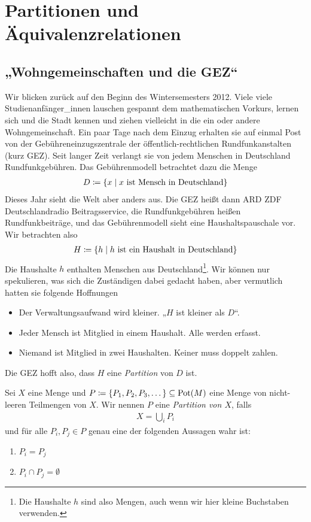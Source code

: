 \section{Partitionen und Äquivalenzrelationen}

\subsection{„Wohngemeinschaften und die GEZ“}

Wir blicken zurück auf den Beginn des Wintersemesters 2012. Viele viele
Studienanfänger\_innen lauschen gespannt dem mathematischen Vorkurs, lernen
sich und die Stadt kennen und ziehen vielleicht in die ein oder andere
Wohngemeinschaft. Ein paar Tage nach dem Einzug erhalten sie auf einmal
Post von der Gebühreneinzugszentrale der öffentlich-rechtlichen
Rundfunkanstalten (kurz GEZ). Seit langer Zeit verlangt sie von jedem
Menschen in Deutschland Rundfunkgebühren. Das Gebührenmodell betrachtet
dazu die Menge
\begin{align*}
  D \coloneqq \{ x \mid x \text{ ist Mensch in Deutschland} \}
\end{align*}
Dieses Jahr sieht die Welt aber anders aus. Die GEZ heißt dann ARD ZDF
Deutschlandradio Beitragsservice, die Rundfunkgebühren heißen
Rundfunkbeiträge, und das Gebührenmodell sieht eine Haushaltspauschale
vor. Wir betrachten also
\begin{align*}
  H \coloneqq \{ h \mid h \text{ ist ein Haushalt in Deutschland} \}
\end{align*}
Die Haushalte $h$ enthalten Menschen aus Deutschland\footnote{Die Haushalte
  $h$ sind also Mengen, auch wenn wir hier kleine Buchstaben verwenden.}.
Wir können nur spekulieren, was sich die Zuständigen dabei gedacht haben,
aber vermutlich hatten sie folgende Hoffnungen

\begin{itemize}
  \item Der Verwaltungsaufwand wird kleiner. „$H$ ist kleiner als $D$“.
  \item Jeder Mensch ist Mitglied in einem Haushalt. Alle werden erfasst.
  \item Niemand ist Mitglied in zwei Haushalten. Keiner muss doppelt zahlen.
\end{itemize}

Die GEZ hofft also, dass $H$ eine \emph{Partition} von $D$ ist.

\begin{defin}
  Sei $X$ eine Menge und $P \coloneqq \{ P_{1}, P_{2}, P_{3}, \dots \}
  \subseteq \operatorname{Pot}(M)$ eine Menge von nicht-leeren Teilmengen von $X$. Wir nennen
  $P$ eine \emph{Partition von $X$}, falls
  \begin{align*}
    X = \bigcup_{i}P_{i}
  \end{align*}
  und für alle $P_{i},P_{j} \in P$ genau eine der folgenden Aussagen wahr
  ist:
  \begin{enumerate}
    \item $P_{i} = P_{j}$
    \item $P_{i} \cap P_{j} = \emptyset$
  \end{enumerate}
\end{defin}

